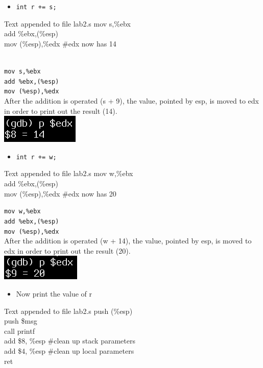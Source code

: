 \documentclass{article}
\begin{document}
\begin{itemize}
\item \verb|int r += s;| 	 
\end{itemize}
\begin{GFT}{Text appended to file lab2.s}
\+mov s,\%ebx\\
\+add \%ebx,(\%esp)\\
\+mov (\%esp),\%edx \#edx now has 14\\
\+\\
\end{GFT}
\verb|mov s,%ebx| \\
\verb|add %ebx,(%esp)| \\
\verb|mov (%esp),%edx| \\
After the addition is operated (s + 9), the value, pointed by esp, is moved to edx in order to print out the result (14). \\
\includegraphics[scale = 0.6]{edx3.png} \\
\noindent{\color{red}\rule{\linewidth}{0.5mm}}
\begin{itemize}
\item \verb|int r += w;| 	 
\end{itemize}
\begin{GFT}{Text appended to file lab2.s}
\+mov w,\%ebx\\
\+add \%ebx,(\%esp)\\
\+mov (\%esp),\%edx \#edx now has 20\\
\end{GFT}
\verb|mov w,%ebx| \\
\verb|add %ebx,(%esp)| \\
\verb|mov (%esp),%edx| \\
After the addition is operated (w + 14), the value, pointed by esp, is moved to edx in order to print out the result (20). \\
\includegraphics[scale = 0.6]{edx4.png} \\
\noindent{\color{red}\rule{\linewidth}{0.5mm}}
\clearpage 


\begin{itemize}
\item Now print the value of r	 
\end{itemize}
\begin{GFT}{Text appended to file lab2.s}
\+ push (\%esp)\\
\+ push \$msg\\
\+ call printf\\
\+ add \$8, \%esp \#clean up stack parameters\\
\+ add \$4, \%esp \#clean up  local parameters\\
\+ ret\\
\end{GFT}
\end{document}
